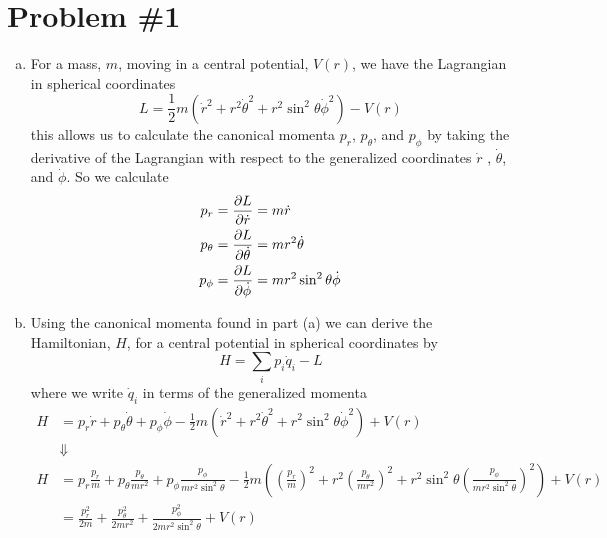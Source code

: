 \documentclass[11pt]{article}
\numberwithin{equation}{section}
\begin{document}


\section{Problem \#1}
\begin{enumerate}[(a)]
\item For a mass, $m$, moving in a central potential, $V(r)$, we have the Lagrangian in 
spherical coordinates 
$$L = \frac{1}{2}m\left(\dot{r}^2 + r^2\dot{\theta}^2 + r^2\sin^2\theta\dot{\phi}^2\right) - V(r)$$
this allows us to calculate the canonical momenta $p_r$, $p_{\theta}$, and $p_{\phi}$ by 
taking the derivative of the Lagrangian with respect to the generalized coordinates $\dot{r}$
, $\dot{\theta}$, and $\dot{\phi}$. So we calculate
\begin{align*}
p_r = \frac{\partial{L}}{\partial{\dot{r}}} &= m\dot{r}\\
p_{\theta} = \frac{\partial{L}}{\partial{\dot{\theta}}} &= mr^2\dot{\theta}\\
p_{\phi} = \frac{\partial{L}}{\partial{\dot{\phi}}} &= mr^2\sin^2\theta\dot{\phi}
\end{align*}

\item Using the canonical momenta found in part (a) we can derive the Hamiltonian, $H$, for a 
central potential in spherical coordinates by
$$H = \sum_{i}p_i\dot{q}_i - L$$
where we write $\dot{q}_i$ in terms of the generalized momenta 
\begin{align*}
H &= p_r\dot{r} + p_{\theta}\dot{\theta} + p_{\phi}\dot{\phi} - \frac{1}{2}m\left(\dot{r}^2 + r^2\dot{\theta}^2 + r^2\sin^2\theta\dot{\phi}^2\right) + V(r)\\
&\Downarrow\\
H &= p_r\frac{p_r}{m} + p_{\theta}\frac{p_{\theta}}{mr^2} + p_{\phi}\frac{p_{\phi}}{mr^2\sin^2\theta} - \frac{1}{2}m\left(\left(\frac{p_r}{m}\right)^2 + r^2\left(\frac{p_{\theta}}{mr^2}\right)^2 + r^2\sin^2\theta\left(\frac{p_{\phi}}{mr^2\sin^2\theta}\right)^2\right) + V(r)\\
&= \frac{p_r^2}{2m} + \frac{p_{\theta}^2}{2mr^2} + \frac{p_{\phi}^2}{2mr^2\sin^2\theta} + V(r)
\end{align*}


\end{enumerate}
\end{document}
